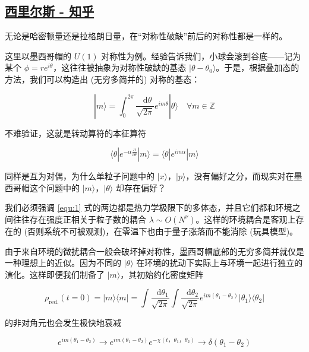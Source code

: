 \documentclass[oneside,a4paper,openany,11pt]{ctexbook}
\newcommand*{\dif}{\mathop{}\!\mathrm{d}} %
\begin{document}
\subsection{\href{https://www.zhihu.com/people/imserious}{西里尔斯 - 知乎}}

无论是哈密顿量还是拉格朗日量，在“对称性破缺”前后的对称性都是一样的。

这里以墨西哥帽的 $U(1)$ 对称性为例。经验告诉我们，小球会滚到谷底——记为某个 $\phi=r e^{i \theta}$，这往往被抽象为对称性破缺的基态 $|\theta-\theta_0\rangle$。于是，根据叠加态的方法，我们可以构造出 (无穷多简并的) 对称的基态：

\begin{equation}
    |m\rangle = \int_0^{2\pi} \frac{\dif \theta}{\sqrt{2\pi}} e^{im \theta} |\theta\rangle \quad \forall m \in \mathbb{Z}
    \label{equ:1}
\end{equation}

不难验证，这就是转动算符的本征算符

\begin{equation*}
    \langle\theta| e^{-\alpha \frac{\partial}{\partial \theta}} |m\rangle = \langle\theta| e^{im\alpha} |m\rangle
\end{equation*}

同样是互为对偶，为什么单粒子问题中的 $|x\rangle，|p\rangle$，没有偏好之分，而现实对在墨西哥帽这个问题中的 $|m\rangle，|\theta\rangle$ 却存在偏好？

我们必须强调 \eqref{equ:1} 式的两边都是热力学极限下的多体态，并且它们都和环境之间往往存在强度正相关于粒子数的耦合 $\lambda \sim O(N^\nu)$。这样的环境耦合是客观上存在的 (否则系统不可被观测)，在零温下也由于量子涨落而不能消除 (玩具模型)。

由于来自环境的微扰耦合一般会破坏掉对称性，墨西哥帽底部的无穷多简并就仅是一种理想上的近似。因为不同的 $|\theta\rangle$ 在环境的扰动下实际上与环境一起进行独立的演化。这样即便我们制备了 $|m\rangle$，其初始约化密度矩阵

\begin{equation}
    \rho_{\mathrm{red.}}(t=0) = |m\rangle \langle m| = \int \frac{\dif \theta_1}{\sqrt{2\pi}} \int \frac{\dif \theta_2}{\sqrt{2\pi}} e^{im(\theta_1-\theta_2)} |\theta_1\rangle \langle\theta_2|
    \label{equ:2}
\end{equation}

的非对角元也会发生极快地衰减

\begin{equation}
    e^{im(\theta_1-\theta_2)} \to e^{im(\theta_1-\theta_2)} e^{-\chi(t，\theta_1，\theta_2)} \to \delta(\theta_1 -\theta_2)
    \label{equ:3}
\end{equation}
\end{document}
